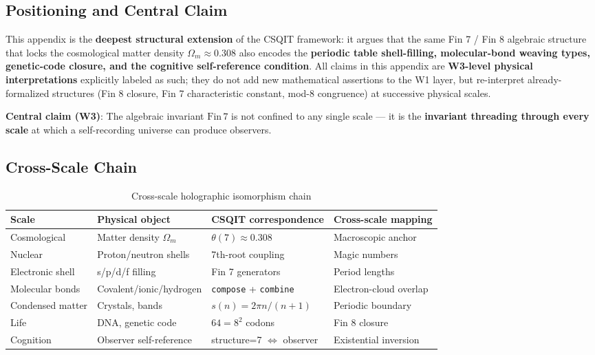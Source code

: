 \documentclass[aps,prd,twocolumn,nofootinbib,floatfix]{revtex4-2}
\begin{document}
\subsection{Positioning and Central Claim}

This appendix is the \textbf{deepest structural extension} of the CSQIT framework: it argues that the same Fin 7 / Fin 8 algebraic structure that locks the cosmological matter density $\Omega_m \approx 0.308$ also encodes the \textbf{periodic table shell-filling, molecular-bond weaving types, genetic-code closure, and the cognitive self-reference condition}. All claims in this appendix are \textbf{W3-level physical interpretations} explicitly labeled as such; they do not add new mathematical assertions to the W1 layer, but re-interpret already-formalized structures (Fin 8 closure, Fin 7 characteristic constant, mod-8 congruence) at successive physical scales.

\textbf{Central claim (W3)}: The algebraic invariant $\mathrm{Fin}\,7$ is not confined to any single scale --- it is the \textbf{invariant threading through every scale} at which a self-recording universe can produce observers.

\subsection{Cross-Scale Chain}

\begin{table}[h]
\centering
\begin{tabular}{|l|l|l|l|}
\hline
Scale & Physical object & CSQIT correspondence & Cross-scale mapping \\
\hline
Cosmological & Matter density $\Omega_m$ & $\theta(7) \approx 0.308$ & Macroscopic anchor \\
Nuclear & Proton/neutron shells & 7th-root coupling & Magic numbers \\
Electronic shell & s/p/d/f filling & Fin 7 generators & Period lengths \\
Molecular bonds & Covalent/ionic/hydrogen & \texttt{compose} + \texttt{combine} & Electron-cloud overlap \\
Condensed matter & Crystals, bands & $s(n)=2\pi n/(n+1)$ & Periodic boundary \\
Life & DNA, genetic code & $64 = 8^2$ codons & Fin 8 closure \\
Cognition & Observer self-reference & structure=7 $\iff$ observer & Existential inversion \\
\hline
\end{tabular}
\caption{Cross-scale holographic isomorphism chain}
\end{table}
\end{document}

